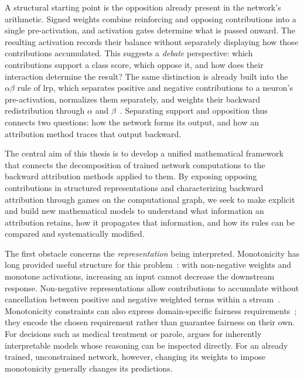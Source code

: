 A structural starting point is the opposition already present in the network's arithmetic. Signed weights combine reinforcing and opposing contributions into a single pre-activation, and activation gates determine what is passed onward. The resulting activation records their balance without separately displaying how those contributions accumulated. This suggests a \emph{debate} perspective: which contributions support a class score, which oppose it, and how does their interaction determine the result? The same distinction is already built into the $\alpha\beta$ rule of \ac{lrp}, which separates positive and negative contributions to a neuron's pre-activation, normalizes them separately, and weights their backward redistribution through $\alpha$ and $\beta$~\parencite{Bach2015}. Separating support and opposition thus connects two questions: how the network forms its output, and how an attribution method traces that output backward.

The central aim of this thesis is to develop a unified mathematical framework that connects the decomposition of trained network computations to the backward attribution methods applied to them. By exposing opposing contributions in structured representations and characterizing backward attribution through games on the computational graph, we seek to make explicit and build new mathematical models to understand what information an attribution retains, how it propagates that information, and how its rules can be compared and systematically modified.

The first obstacle concerns the \emph{representation} being interpreted. Monotonicity has long provided useful structure for this problem~\parencite{Sill1997_MonotonicNetworks,Amos2017}: with non-negative weights and monotone activations, increasing an input cannot decrease the downstream response. Non-negative representations allow contributions to accumulate without cancellation between positive and negative weighted terms within a stream~\parencite{ayinde2018nonnegativity,lee1999nmf}. Monotonicity constraints can also express domain-specific fairness requirements~\parencite{Wang2020ShapeFairness}; they encode the chosen requirement rather than guarantee fairness on their own. For decisions such as medical treatment or parole, \textcite{rudin2019stop} argues for inherently interpretable models whose reasoning can be inspected directly. For an already trained, unconstrained network, however, changing its weights to impose monotonicity generally changes its predictions.

